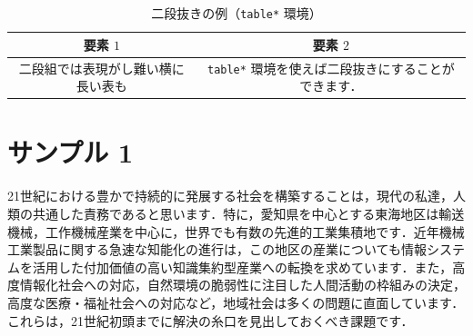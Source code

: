 \documentclass[a4j,9pt,twocolumn,dvipdfmx]{jsarticle}
\begin{document}
\begin{table}
 \caption{二段抜きの例（\texttt{table*} 環境）}
 \label{tab:exp}
 \vspace{-1em}
 \begin{center}
  \begin{tabular}{|c|c|}
   \hline
   要素 $1$&要素 $2$\\
   \hline
   二段組では表現がし難い横に長い表も&\texttt{table*} 環境を使えば二段抜きにすることができます．\\
   \hline
  \end{tabular}
 \end{center}
\end{table}

\section{サンプル 1}
21世紀における豊かで持続的に発展する社会を構築することは，現代の私達，人
類の共通した責務であると思います．特に，愛知県を中心とする東海地区は輸送
機械，工作機械産業を中心に，世界でも有数の先進的工業集積地です．近年機械
工業製品に関する急速な知能化の進行は，この地区の産業についても情報システ
ムを活用した付加価値の高い知識集約型産業への転換を求めています．また，高
度情報化社会への対応，自然環境の脆弱性に注目した人間活動の枠組みの決定，
高度な医療・福祉社会への対応など，地域社会は多くの問題に直面しています．
これらは，21世紀初頭までに解決の糸口を見出しておくべき課題です．
\end{document}
